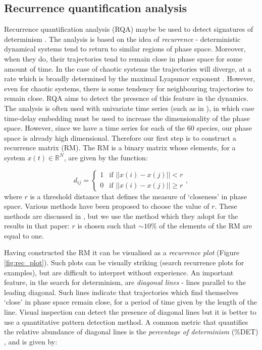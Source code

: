 \subsection{Recurrence quantification analysis}
\label{sec:rqa}      

Recurrence quantification analysis (RQA) maybe be used to detect signatures of determinism \cite{marwan2007recurrence,aparicio2008detecting,saul09phd}. The analysis is based on the idea of \emph{recurrence} - deterministic dynamical systems tend to return to similar regions of phase space. Moreover, when they do, their trajectories tend to remain close in phase space for some amount of time. In the case of chaotic systems the trajectories will diverge, at a rate which is broadly determined by the maximal Lyapunov exponent \cite{saul09phd}. However, even for chaotic systems, there is some tendency for neighbouring trajectories to remain close. RQA aims to detect the presence of this feature in the dynamics. The analysis is often used with univariate time series (such as in \cite{saul09phd}), in which case time-delay embedding must be used to increase the dimensionality of the phase space. However, since we have a time series for each of the 60 species, our phase space is already high dimensional. Therefore our first step is to construct a recurrence matrix (RM). The RM is a binary matrix whose elements, for a system $x(t) \in \mathbb{R}^N$, are given by the function:

\begin{equation}
d_{ij} = \begin{cases} 1 &\mbox{if } ||x(i)-x(j)||<r \\
0 & \mbox{if } ||x(i)-x(j)|| \geq r \end{cases},
\label{eq:rm}
\end{equation}
%
where $r$ is a threshold distance that defines the measure of `closeness' in phase space. Various methods have been proposed to choose the value of $r$. These methods are discussed in \cite{aparicio2008detecting}, but we use the method which they adopt for the results in that paper: $r$ is chosen such that $\sim 10\%$ of the elements of the RM are equal to one.

Having constructed the RM it can be visualised as a \emph{recurrence plot} (Figure \ref{fig:rec_plot}). Such plots can be visually striking (search recurrence plots for examples), but are difficult to interpret without experience. An important feature, in the search for determinism, are \emph{diagonal lines} - lines parallel to the leading diagonal. Such lines indicate that trajectories which find themselves `close' in phase space remain close, for a period of time given by the length of the line. Visual inspection can detect the presence of diagonal lines but it is better to use a quantitative pattern detection method. A common metric that quantifies the relative abundance of diagonal lines is the \emph{percentage of determinism} ($\%$DET) \cite{aparicio2008detecting,marwan2007recurrence}, and is given by:

